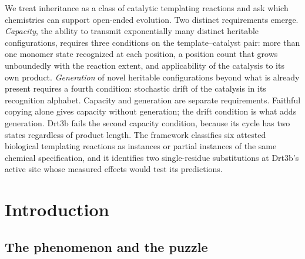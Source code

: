 \documentclass[aps,prx,reprint,amsmath,amssymb,floatfix,superscriptaddress,nofootinbib]{revtex4-2}
\theoremstyle{plain-thm}
\theoremstyle{definition-thm}
\begin{document}
We treat inheritance as a class of catalytic templating reactions and ask which chemistries can support open-ended evolution. Two distinct requirements emerge. \emph{Capacity}, the ability to transmit exponentially many distinct heritable configurations, requires three conditions on the template--catalyst pair: more than one monomer state recognized at each position, a position count that grows unboundedly with the reaction extent, and applicability of the catalysis to its own product. \emph{Generation} of novel heritable configurations beyond what is already present requires a fourth condition: stochastic drift of the catalysis in its recognition alphabet. Capacity and generation are separate requirements. Faithful copying alone gives capacity without generation; the drift condition is what adds generation. Drt3b fails the second capacity condition, because its cycle has two states regardless of product length. The framework classifies six attested biological templating reactions as instances or partial instances of the same chemical specification, and it identifies two single-residue substitutions at Drt3b's active site whose measured effects would test its predictions.


\section{Introduction}

\subsection{The phenomenon and the puzzle}
\end{document}
